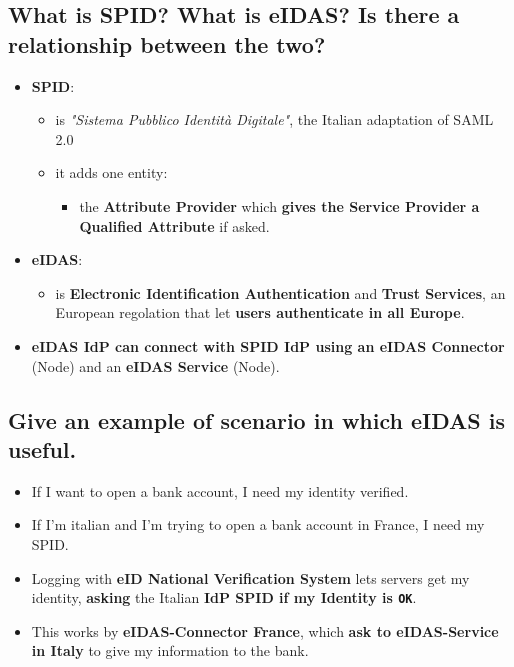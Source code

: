\documentclass[9pt, letterpaper]{article}
\begin{document}
\newpage

\subsection{What is SPID? What is eIDAS? Is there a relationship between the two?}
\begin{itemize}
	\item \textbf{SPID}:
	      \begin{itemize}
		      \item is \textit{"Sistema Pubblico Identità Digitale"}, the Italian adaptation of SAML 2.0
		      \item it adds one entity:
		            \begin{itemize}
			            \item the \textbf{Attribute Provider} which \textbf{gives the Service Provider a Qualified Attribute} if asked.
		            \end{itemize}
	      \end{itemize}
	\item \textbf{eIDAS}:
	      \begin{itemize}
		      \item is \textbf{Electronic Identification Authentication} and \textbf{Trust Services}, an European regolation that let \textbf{users authenticate in all Europe}.
	      \end{itemize}
	\item \textbf{eIDAS IdP can connect with SPID IdP using an eIDAS Connector} (Node) and an \textbf{eIDAS Service} (Node).
\end{itemize}

\subsection{Give an example of scenario in which eIDAS is useful.}
\begin{itemize}
	\item If I want to open a bank account, I need my identity verified.
	\item If I'm italian and I'm trying to open a bank account in France, I need my SPID.
	\item Logging with \textbf{eID National Verification System} lets servers get my identity, \textbf{asking} the Italian \textbf{IdP SPID if my Identity is {\tt OK}}.
	\item This works by \textbf{eIDAS-Connector France}, which \textbf{ask to eIDAS-Service in Italy} to give my information to the bank.
\end{itemize}
\end{document}
